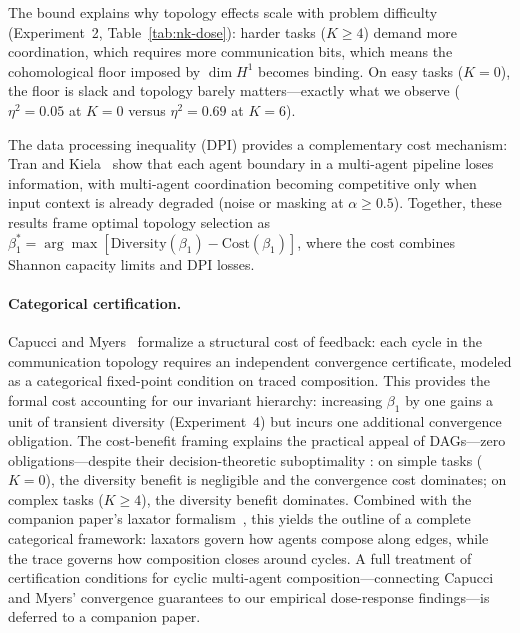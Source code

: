 The bound explains why topology effects scale with problem difficulty
(Experiment~2, Table~\ref{tab:nk-dose}): harder tasks ($K \geq 4$)
demand more coordination, which requires more communication bits,
which means the cohomological floor imposed by $\dim H^1$ becomes
binding. On easy tasks ($K = 0$), the floor is slack and topology
barely matters---exactly what we observe ($\eta^2 = 0.05$ at $K = 0$
versus $\eta^2 = 0.69$ at $K = 6$).

The data processing inequality (DPI) provides a complementary cost
mechanism: Tran and Kiela~\cite{tran2026dpi} show that each agent
boundary in a multi-agent pipeline loses information, with
multi-agent coordination becoming competitive only when input
context is already degraded (noise or masking at $\alpha \geq 0.5$).
Together, these results frame optimal topology selection as
$\beta_1^* = \arg\max[\text{Diversity}(\beta_1) -
\text{Cost}(\beta_1)]$, where the cost combines Shannon capacity
limits and DPI losses.



\paragraph{Categorical certification.}
Capucci and Myers~\cite{capucci2026feedback} formalize a structural
cost of feedback: each cycle in the communication topology requires an
independent convergence certificate, modeled as a categorical
fixed-point condition on traced composition.
This provides the formal cost accounting for our invariant hierarchy:
increasing $\beta_1$ by one gains a unit of transient diversity
(Experiment~4) but incurs one additional convergence obligation.
The cost-benefit framing explains the practical appeal of DAGs---zero
obligations---despite their decision-theoretic suboptimality
\cite{ao2026reliability}: on simple tasks ($K = 0$), the diversity
benefit is negligible and the convergence cost dominates; on complex
tasks ($K \geq 4$), the diversity benefit dominates.
Combined with the companion paper's laxator
formalism~\cite{langer2026games}, this yields the outline of a
complete categorical framework: laxators govern how agents compose
along edges, while the trace governs how composition closes around
cycles.
A full treatment of certification conditions for cyclic multi-agent
composition---connecting Capucci and Myers' convergence guarantees to
our empirical dose-response findings---is deferred to a companion
paper.
